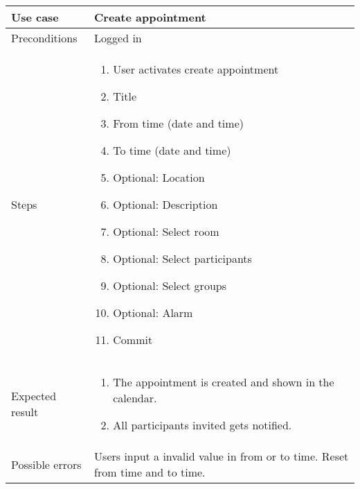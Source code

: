 \documentclass[a4paper, 10pt]{article}
\begin{document}
\begin{tabularx}{\textwidth}{ |X|X| }
\hline
\rowcolor{Gray}
Use case &  Create appointment \\ \hline
Preconditions & Logged in \\ \hline
Steps & 
\begin{enumerate}
	\item User activates create appointment
	\item Title
	\item From time (date and time)
	\item To time (date and time)
	\item Optional: Location
	\item Optional: Description
	\item Optional: Select room
	\item Optional: Select participants
	\item Optional: Select groups
	\item Optional: Alarm
	\item Commit
\end{enumerate}\\ \hline
Expected result & 
\begin{enumerate}
	\item The appointment is created and shown in the calendar.
	\item All participants invited gets notified. 
\end{enumerate} \\ \hline
Possible errors & Users input a invalid value in from or to time. Reset from time and to time. \\ \hline


\end{tabularx}
\end{document}
